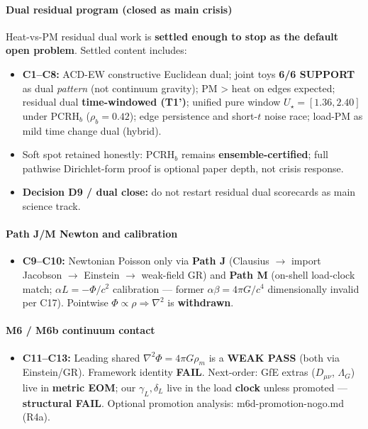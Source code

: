 \documentclass[
  11pt,
]{article}
\providecommand{\tightlist}{%
  \setlength{\itemsep}{0pt}\setlength{\parskip}{0pt}}
\begin{document}
\paragraph{Dual residual program (closed as main
crisis)}\label{dual-residual-program-closed-as-main-crisis}

Heat-vs-PM residual dual work is \textbf{settled enough to stop as the
default open problem}. Settled content includes:

\begin{itemize}
\tightlist
\item
  \textbf{C1--C8:} ACD-EW constructive Euclidean dual; joint toys
  \textbf{6/6 SUPPORT} as dual \emph{pattern} (not continuum gravity);
  PM \textgreater{} heat on edges expected; residual dual
  \textbf{time-windowed (T1')}; unified pure window
  \(U_\star=[1.36,2.40]\) under PCRH\(_b\) (\(\rho_b=0.42\)); edge
  persistence and short-\(t\) noise race; load-PM as mild time change
  dual (hybrid).
\item
  Soft spot retained honestly: PCRH\(_b\) remains
  \textbf{ensemble-certified}; full pathwise Dirichlet-form proof is
  optional paper depth, not crisis response.
\item
  \textbf{Decision D9 / dual close:} do not restart residual dual
  scorecards as main science track.
\end{itemize}

\paragraph{Path J/M Newton and
calibration}\label{path-jm-newton-and-calibration}

\begin{itemize}
\tightlist
\item
  \textbf{C9--C10:} Newtonian Poisson only via \textbf{Path J} (Clausius
  $\to$ import Jacobson $\to$ Einstein $\to$ weak-field GR) and \textbf{Path M}
  (on-shell load-clock match; \(\alpha L=-\Phi/c^2\) calibration ---
  former \(\alpha\beta=4\pi G/c^4\) dimensionally invalid per C17).
  Pointwise \(\Phi\propto\rho\Rightarrow\nabla^2\) is
  \textbf{withdrawn}.
\end{itemize}

\paragraph{M6 / M6b continuum contact}\label{m6-m6b-continuum-contact}

\begin{itemize}
\tightlist
\item
  \textbf{C11--C13:} Leading shared \(\nabla^2\Phi=4\pi G\rho_m\) is a
  \textbf{WEAK PASS} (both via Einstein/GR). Framework identity
  \textbf{FAIL}. Next-order: GfE extras (\(D_{\mu\nu}\), \(\Lambda_G\))
  live in \textbf{metric EOM}; our \(\gamma_L,\delta_L\) live in the
  load \textbf{clock} unless promoted --- \textbf{structural FAIL}.
  Optional promotion analysis: m6d-promotion-nogo.md (R4a).
\end{itemize}
\end{document}
